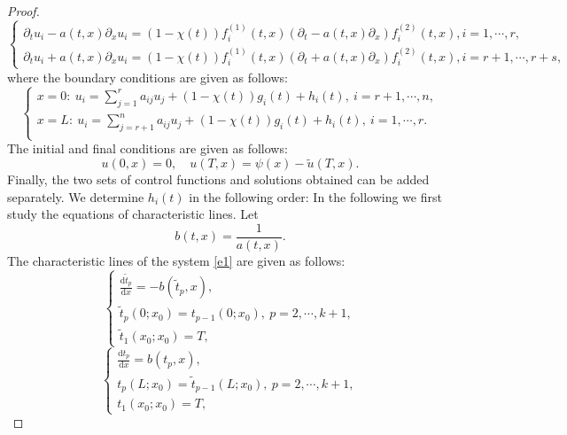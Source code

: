 \documentclass[a4paper,reqno,11pt]{amsart}
\numberwithin{equation}{section} %
\begin{document}
\begin{proof}
	\begin{equation}\label{e6}
		\left\{\begin{array}{l}
		\partial_t u_i- a(t,x)\partial_x u_i=(1-\chi (t))f^{(1)}_i(t,x)(\partial_t - a(t,x)\partial_x)f^{(2)}_i(t,x), i=1, \cdots, r, \\
		\partial_t u_i+ a(t,x)\partial_x u_i=(1-\chi (t))f^{(1)}_i(t,x)(\partial_t + a(t,x)\partial_x)f^{(2)}_i(t,x), i=r+1, \cdots, r+s,
		\end{array}\right.
	\end{equation}
where the boundary conditions are given as follows:
\begin{equation}\label{e7}
		\left\{ \begin{array}{l}
		x=0:\ u_i=\sum_{j=1}^r{a_{ij}u_j + (1-\chi (t))g_i(t) + h_i\left( t \right) ,\ i=r+1,\cdots ,n,}\\
		x=L:\ u_i=\sum_{j=r+1}^n{a_{ij}u_j +(1-\chi (t))g_i(t) + h_i\left( t \right) ,\ i=1,\cdots ,r.}\\
		\end{array} \right. 
	\end{equation}
The initial and final conditions are given as follows:
\begin{equation}\label{e8}
		u(0,x)=0 ,\quad u(T,x)=\psi (x)- \tilde{u}(T,x).
	\end{equation}
Finally, the two sets of control functions and solutions obtained can be added separately.
We determine $h_i\left( t \right)$ in the following order:
In the following we first study the equations of characteristic lines. Let 
$$
b(t,x)=\frac{1}{a(t,x)}.
$$
The characteristic lines of the system \eqref{e1} are given as follows:
\begin{equation}\label{27}
    \left\{ \begin{array}{l}
        \frac{\text{d}\tilde{t} _p}{\text{d}x}= -b\left( \tilde{t} _p ,x \right), \\
        \tilde{t} _p(0;x_0) = t_{p-1}(0;x_0) ,\ p=2,\cdots ,k+1,\\
        \tilde{t} _1(x_0;x_0) = T,
    \end{array} \right. 
    \end{equation}
\begin{equation}\label{28}
    \left\{ \begin{array}{l}
        \frac{\text{d}t_p}{\text{d}x}= b\left( t_p,x \right) ,\\
        t_p(L;x_0) = \tilde{t} _{p-1}(L;x_0) ,\ p=2,\cdots ,k+1,\\
        t_1(x_0;x_0) = T,
    \end{array} \right. 

\end{equation}
\end{proof}
\end{document}

